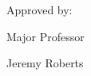     \begin{flushright}
    Approved by:\\
    \vspace{0.3cm}
    \begin{singlespace}
    Major Professor



    Jeremy Roberts\\
    \end{singlespace}
    \end{flushright}


